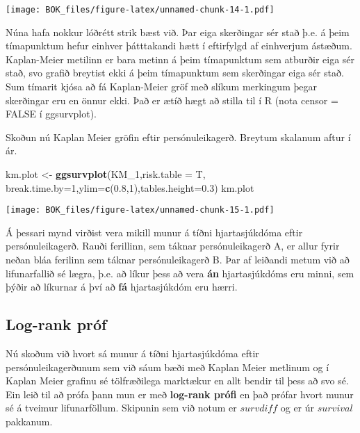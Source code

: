 \documentclass[
]{book}
\newenvironment{Shaded}{\begin{snugshade}}{\end{snugshade}}
\newcommand{\DataTypeTok}[1]{\textcolor[rgb]{0.13,0.29,0.53}{#1}}
\newcommand{\DecValTok}[1]{\textcolor[rgb]{0.00,0.00,0.81}{#1}}
\newcommand{\FloatTok}[1]{\textcolor[rgb]{0.00,0.00,0.81}{#1}}
\newcommand{\KeywordTok}[1]{\textcolor[rgb]{0.13,0.29,0.53}{\textbf{#1}}}
\newcommand{\NormalTok}[1]{#1}
\newcommand{\StringTok}[1]{\textcolor[rgb]{0.31,0.60,0.02}{#1}}
\begin{document}
\texttt{[image: BOK\_files/figure-latex/unnamed-chunk-14-1.pdf]}

Núna hafa nokkur lóðrétt strik bæst við. Þar eiga skerðingar sér stað þ.e. á þeim tímapunktum hefur einhver þátttakandi hætt í eftirfylgd af einhverjum ástæðum. Kaplan-Meier metilinn er bara metinn á þeim tímapunktum sem atburðir eiga sér stað, svo grafið breytist ekki á þeim tímapunktum sem skerðingar eiga sér stað. Sum tímarit kjósa að fá Kaplan-Meier gröf með slíkum merkingum þegar skerðingar eru en önnur ekki. Það er ætíð hægt að stilla til í R (nota censor = FALSE í ggsurvplot).

Skoðun nú Kaplan Meier gröfin eftir persónuleikagerð. Breytum skalanum aftur í ár.

\begin{Shaded}
\begin{Highlighting}[]
\NormalTok{km.plot <{-}}\StringTok{ }\KeywordTok{ggsurvplot}\NormalTok{(KM\_}\DecValTok{1}\NormalTok{,}\DataTypeTok{risk.table =}\NormalTok{ T,}
                        \DataTypeTok{break.time.by=}\DecValTok{1}\NormalTok{,}\DataTypeTok{ylim=}\KeywordTok{c}\NormalTok{(}\FloatTok{0.8}\NormalTok{,}\DecValTok{1}\NormalTok{),}\DataTypeTok{tables.height=}\FloatTok{0.3}\NormalTok{) }
\NormalTok{km.plot}
\end{Highlighting}
\end{Shaded}

\texttt{[image: BOK\_files/figure-latex/unnamed-chunk-15-1.pdf]}

Á þessari mynd virðist vera mikill munur á tíðni hjartasjúkdóma eftir persónuleikagerð. Rauði ferillinn, sem táknar persónuleikagerð A, er allur fyrir neðan bláa ferilinn sem táknar persónuleikagerð B. Þar af leiðandi metum við að lifunarfallið sé lægra, þ.e. að líkur þess að vera \textbf{án} hjartasjúkdóms eru minni, sem þýðir að líkurnar á því að \textbf{fá} hjartasjúkdóm eru hærri.

\hypertarget{log-rank-pruxf3f}{%
\subsection{Log-rank próf}\label{log-rank-pruxf3f}}

Nú skoðum við hvort sá munur á tíðni hjartasjúkdóma eftir persónuleikagerðunum sem við sáum bæði með Kaplan Meier metlinum og í Kaplan Meier grafinu sé tölfræðilega marktækur en allt bendir til þess að svo sé. Ein leið til að prófa þann mun er með \textbf{log-rank prófi} en það prófar hvort munur sé á tveimur lifunarföllum. Skipunin sem við notum er \(survdiff\) og er úr \(survival\) pakkanum.
\end{document}
